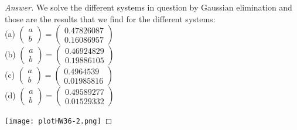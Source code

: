 \documentclass [11pt, letterpaper] {amsart}
\theoremstyle{plain}
\theoremstyle{definition}
\begin{document}
\begin{proof}[Answer]
We solve the different systems in question by Gaussian elimination and those are the results that we find for the different systems: \\
(a) $\left(\begin{matrix}
                    a\\
                    b
                  \end{matrix}\right) = \left(\begin{matrix}
                    0.47826087\\
                    0.16086957
                  \end{matrix}\right) $
\\(b) $\left(\begin{matrix}
                    a\\
                    b
                  \end{matrix}\right) = \left(\begin{matrix}
                    0.46924829\\
                    0.19886105
                  \end{matrix}\right) $
\\(c) $\left(\begin{matrix}
                    a\\
                    b
                  \end{matrix}\right) = \left(\begin{matrix}
                    0.4964539\\
                    0.01985816
                  \end{matrix}\right) $
\\(d) $\left(\begin{matrix}
                    a\\
                    b
                  \end{matrix}\right) = \left(\begin{matrix}
                    0.49589277\\
                    0.01529332
                  \end{matrix}\right) $
                  
                  \texttt{[image: plotHW36-2.png]}


\end{proof}
\end{document}
